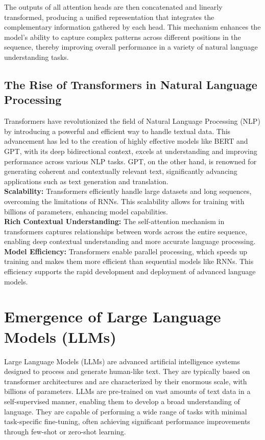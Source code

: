The outputs of all attention heads are then concatenated and linearly transformed, producing a unified representation that integrates the complementary information gathered by each head. This mechanism enhances the model’s ability to capture complex patterns across different positions in the sequence, thereby improving overall performance in a variety of natural language understanding tasks\cite{vaswani2017attention}.

\subsection{The Rise of Transformers in Natural Language Processing}
Transformers have revolutionized the field of Natural Language Processing (NLP) by introducing a powerful and efficient way to handle textual data. This advancement has led to the creation of highly effective models like BERT and GPT, with its deep bidirectional context, excels at understanding and improving performance across various NLP tasks. GPT, on the other hand, is renowned for generating coherent and contextually relevant text, significantly advancing applications such as text generation and translation\cite{devlin2019bert}.\\
\textbf{Scalability:} Transformers efficiently handle large datasets and long sequences, overcoming the limitations of RNNs. This scalability allows for training with billions of parameters, enhancing model capabilities.\\
\textbf{Rich Contextual Understanding: }The self-attention mechanism in transformers captures relationships between words across the entire sequence, enabling deep contextual understanding and more accurate language processing.\\
\textbf{Model Efficiency:} Transformers enable parallel processing, which speeds up training and makes them more efficient than sequential models like RNNs. This efficiency supports the rapid development and deployment of advanced language models\cite{vaswani2017attention}.
\section{ Emergence of Large Language Models (LLMs)}

Large Language Models (LLMs) are advanced artificial intelligence systems designed to process and generate human-like text. They are typically based on transformer architectures and are characterized by their enormous scale, with billions of parameters. LLMs are pre-trained on vast amounts of text data in a self-supervised manner, enabling them to develop a broad understanding of language. They are capable of performing a wide range of tasks with minimal task-specific fine-tuning, often achieving significant performance improvements through few-shot or zero-shot learning\cite{brown2020language}.
